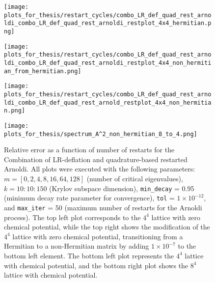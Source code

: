 \begin{figure}[H]
    \centering
    \begin{minipage}{0.45\textwidth}
        \centering
        \texttt{[image: plots\_for\_thesis/restart\_cycles/combo\_LR\_def\_quad\_rest\_arnoldi\_combo\_LR\_def\_quad\_rest\_arnoldi\_restplot\_4x4\_hermitian.png]} %
    \end{minipage}%
    \hspace{0.02\textwidth} %
    \begin{minipage}{0.45\textwidth}
        \centering
        \texttt{[image: plots\_for\_thesis/restart\_cycles/combo\_LR\_def\_quad\_rest\_arnoldi\_combo\_LR\_def\_quad\_rest\_arnoldi\_restplot\_4x4\_non\_hermitian\_from\_hermitian.png]} %
    \end{minipage}
    
    \vspace{0.02\textwidth} %
    
    \begin{minipage}{0.45\textwidth}
        \centering
        \texttt{[image: plots\_for\_thesis/restart\_cycles/combo\_LR\_def\_quad\_rest\_arnoldi\_combo\_LR\_def\_quad\_rest\_arnold\_restplot\_4x4\_non\_hermitian.png]} %
    \end{minipage}%
    \hspace{0.02\textwidth} %
    \begin{minipage}{0.45\textwidth}
        \centering
        \texttt{[image: plots\_for\_thesis/spectrum\_A^2\_non\_hermitian\_8\_to\_4.png]} %
    \end{minipage}
    
    \caption{\small Relative error as a function of number of restarts for the Combination of LR-deflation and quadrature-based restarted Arnoldi. All plots were executed with the following parameters: $m = [0, 2, 4, 8, 16, 64, 128]$ (number of critical eigenvalues), $k = 10:10:150$ (Krylov subspace dimension), \texttt{min\_decay} = 0.95 (minimum decay rate parameter for convergence), \texttt{tol} = $1 \times 10^{-12}$, and \texttt{max\_iter} = 50 (maximum number of restarts for the Arnoldi process). The top left plot corresponds to the $4^4$ lattice with zero chemical potential, while the top right shows the modification of the $4^4$ lattice with zero chemical potential, transitioning from a Hermitian to a non-Hermitian matrix by adding $1 \times 10^{-7}$ to the bottom left element. The bottom left plot represents the $4^4$ lattice with chemical potential, and the bottom right plot shows the $8^4$ lattice with chemical potential.}
    \label{fig:combo_LR+restarted_arnoldi_rest_plot}
    
\end{figure}